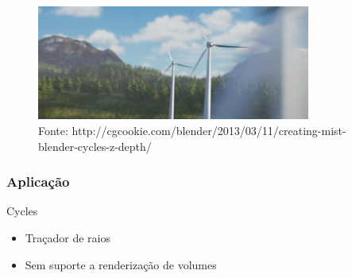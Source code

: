 \documentclass{beamer}
\begin{document}
\begin{frame}

\begin{figure}[t]
\center
\includegraphics[width=9cm]{cyclesHeader}
\caption*{\tiny Fonte: http://cgcookie.com/blender/2013/03/11/creating-mist-blender-cycles-z-depth/}
\end{figure}

\frametitle{Aplicação}
Cycles
\begin{itemize}
\item Traçador de raios
\item Sem suporte a renderização de volumes
\end{itemize}

\end{frame}
\end{document}
